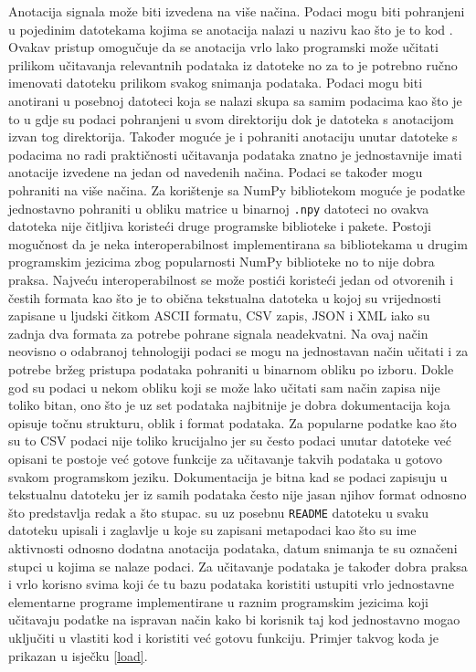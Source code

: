 \documentclass[times, utf8, diplomski]{fer}
\begin{document}
Anotacija signala može biti izvedena na više načina. Podaci mogu biti pohranjeni u pojedinim datotekama kojima
se anotacija nalazi u nazivu kao što je to kod \cite{HuGaDB}. Ovakav pristup omogučuje da se anotacija vrlo
lako programski može učitati prilikom učitavanja relevantnih podataka iz datoteke no za to je potrebno ručno
imenovati datoteku prilikom svakog snimanja podataka. Podaci mogu biti anotirani u posebnoj datoteci koja se
nalazi skupa sa samim podacima kao što je to u \cite{zou2020gait} gdje su podaci pohranjeni u svom direktoriju
dok je datoteka s anotacijom izvan tog direktorija. Također moguće je i pohraniti anotaciju unutar datoteke s
podacima no radi praktičnosti učitavanja podataka znatno je jednostavnije imati anotacije izvedene na jedan od
navedenih načina. Podaci se također mogu pohraniti na više načina. Za korištenje sa NumPy bibliotekom moguće je
podatke jednostavno pohraniti u obliku matrice u binarnoj \texttt{.npy} datoteci no ovakva datoteka nije čitljiva
koristeći druge programske biblioteke i pakete. Postoji mogučnost da je neka interoperabilnost implementirana
sa bibliotekama u drugim programskim jezicima zbog popularnosti NumPy biblioteke no to nije dobra praksa.
Najveću interoperabilnost se može postići koristeći jedan od otvorenih i čestih formata
kao što je to obična tekstualna datoteka u kojoj su vrijednosti zapisane u ljudski čitkom ASCII formatu,
CSV zapis, JSON i XML iako su zadnja dva formata za potrebe pohrane signala neadekvatni.
Na ovaj način neovisno o odabranoj tehnologiji podaci se mogu na jednostavan način učitati i za potrebe bržeg
pristupa podataka pohraniti u binarnom obliku po izboru. Dokle god su podaci u nekom obliku koji se može lako
učitati sam način zapisa nije toliko bitan, ono što je uz set podataka najbitnije je dobra dokumentacija koja
opisuje točnu strukturu, oblik i format podataka. Za popularne podatke kao što su to CSV podaci nije toliko
krucijalno jer su često podaci unutar datoteke već opisani te postoje već gotove funkcije za učitavanje takvih
podataka u gotovo svakom programskom jeziku. Dokumentacija je bitna kad se podaci zapisuju u tekstualnu datoteku
jer iz samih podataka često nije jasan njihov format odnosno što predstavlja redak a što stupac.
\cite{HuGaDB} su uz posebnu \texttt{README} datoteku u svaku datoteku upisali i zaglavlje u koje su zapisani
metapodaci kao što su ime aktivnosti odnosno dodatna anotacija podataka, datum snimanja te su označeni stupci
u kojima se nalaze podaci. Za učitavanje podataka je također dobra praksa i vrlo korisno svima koji će tu bazu
podataka koristiti ustupiti vrlo jednostavne elementarne programe implementirane u raznim programskim jezicima
koji učitavaju podatke na ispravan način kako bi korisnik taj kod jednostavno mogao uključiti u vlastiti kod i
koristiti već gotovu funkciju. Primjer takvog koda je prikazan u isječku \ref{load}.
\end{document}
